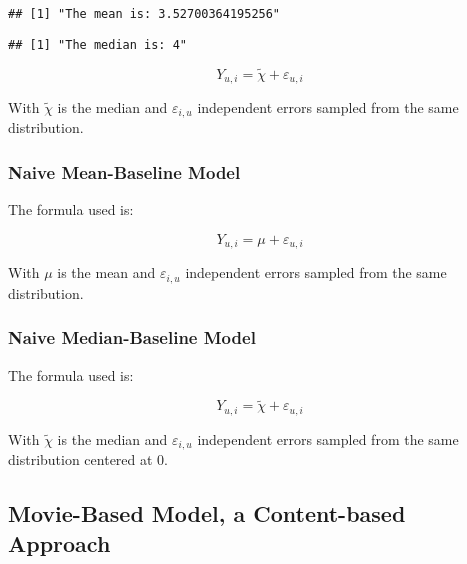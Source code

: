 \documentclass[]{article}
\newenvironment{Shaded}{}{}
\newcommand{\KeywordTok}[1]{\textcolor[rgb]{0.00,0.44,0.13}{\textbf{#1}}}
\newcommand{\NormalTok}[1]{#1}
\newcommand{\OperatorTok}[1]{\textcolor[rgb]{0.40,0.40,0.40}{#1}}
\newcommand{\StringTok}[1]{\textcolor[rgb]{0.25,0.44,0.63}{#1}}
\begin{document}
\begin{verbatim}
## [1] "The mean is: 3.52700364195256"
\end{verbatim}

\begin{Shaded}
\end{Shaded}

\begin{verbatim}
## [1] "The median is: 4"
\end{verbatim}

\[Y_{u,i} = \tilde{\chi} + \varepsilon_{u,i}\]

With \(\tilde{\chi}\) is the median and \(\varepsilon_{i,u}\)
independent errors sampled from the same distribution.

\hypertarget{naive-mean-baseline-model}{%
\subsubsection{Naive Mean-Baseline
Model}\label{naive-mean-baseline-model}}

The formula used is:

\[Y_{u,i} = \mu + \varepsilon_{u,i}\]

With \(\mu\) is the mean and \(\varepsilon_{i,u}\) independent errors
sampled from the same distribution.

\hypertarget{naive-median-baseline-model}{%
\subsubsection{Naive Median-Baseline
Model}\label{naive-median-baseline-model}}

The formula used is:

\[Y_{u,i} = \tilde{\chi} + \varepsilon_{u,i}\]

With \(\tilde{\chi}\) is the median and \(\varepsilon_{i,u}\)
independent errors sampled from the same distribution centered at 0.

\hypertarget{movie-based-model-a-content-based-approach}{%
\subsection{Movie-Based Model, a Content-based
Approach}\label{movie-based-model-a-content-based-approach}}
\end{document}
